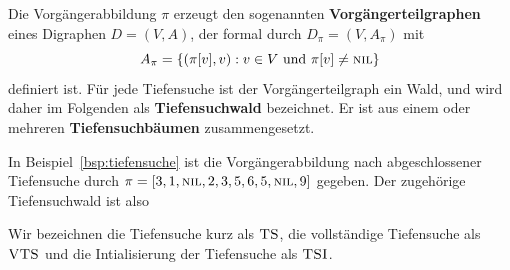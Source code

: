 \begin{defn} 
Die Vorgängerabbildung $\pi$ erzeugt den sogenannten \textbf{Vor\-gänger\-teil\-graphen} eines Digraphen $D=(V,A)$, der formal durch $D_\pi=(V,A_\pi)$ mit
\[
A_\pi = \left\{(\pi[v],v) : v \in V \text{ und } \pi[v] \neq \mathop{\text{\textsc{nil}}}\right\}
\]
definiert ist.
Für jede Tiefensuche ist der Vorgängerteilgraph ein Wald, und wird daher im Folgenden als \textbf{Tiefensuchwald} bezeichnet.
Er ist aus einem oder mehreren \textbf{Tiefensuchbäumen} zusammengesetzt.
\end{defn} 

\begin{bsp} 
In Beispiel~\ref{bsp:tiefensuche} ist die Vorgängerabbildung nach abgeschlossener Tiefensuche durch $\pi=[3,1,\mathop{\text{\textsc{nil}}},2,3,5,6,5,\mathop{\text{\textsc{nil}}},9]$ gegeben.
Der zugehörige Tiefensuchwald ist also

\begin{center} 
\end{center} 
\end{bsp} 

\begin{bem}
		Wir bezeichnen die Tiefensuche kurz als $\mathop{\text{\textsc{TS}}}$, die vollständige Tiefensuche als $\mathop{\text{\textsc{VTS}}}$ und die Intialisierung der Tiefensuche als $\mathop{\text{\textsc{TSI}}}$. 
\end{bem} 

